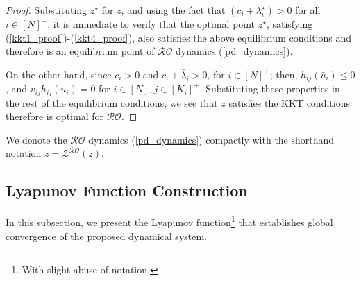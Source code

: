 \documentclass[journal,twoside,web]{ieeecolor}
\newcommand{\rev}[1]{#1}
\begin{document}
\begin{proof}
Substituting $z^\star$ for $\bar{z}$, and using the fact that $(c_i+\lambda_i^\star)>0$ for all $i\in[N]^+$, it is immediate to verify that the optimal point $z^\star$, satisfying (\ref{kkt1_proof})-(\ref{kkt4_proof}), also satisfies the above equilibrium conditions and therefore is an equilibrium point of $\mathcal{RO}$ dynamics (\ref{pd_dynamics}).

On the other hand, since $c_i> 0$ and $c_i+\bar{\lambda}_i>0$,  for $i\in[N]^+$; then, $h_{ij}(\bar{u}_i)\leq 0$, and $\bar{v}_{ij} \rev{h_{ij}(\bar{u}_{i})}=0$ for $i\in[N],j\in[K_i]^+$. Substituting these properties in the rest of the equilibrium conditions, we see that $\bar{z}$ satisfies the KKT conditions therefore is optimal for $\mathcal{RO}$.
\end{proof}


We denote the $\mathcal{RO}$ dynamics (\ref{pd_dynamics}) compactly with the shorthand notation $\dot z=\mathcal{Z}^{\mathcal{RO}}(z)$.

\subsection*{Lyapunov Function Construction}
In this subsection, we present the Lyapunov function\footnote{With slight abuse of notation.} that establishes global convergence of the proposed dynamical system.
\end{document}
